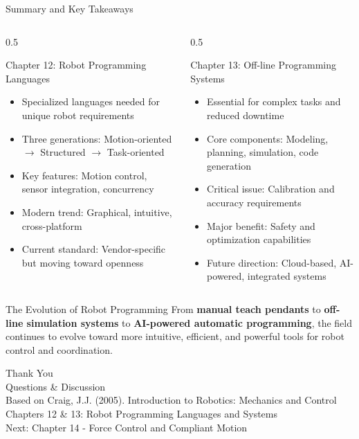 \documentclass[10pt,aspectratio=169]{beamer}
\begin{document}
\begin{frame}{Summary and Key Takeaways}
\begin{columns}[T]
\begin{column}{0.5\textwidth}
\begin{block}{Chapter 12: Robot Programming Languages}
\begin{itemize}
\item Specialized languages needed for unique robot requirements
\item Three generations: Motion-oriented $\rightarrow$ Structured $\rightarrow$ Task-oriented
\item Key features: Motion control, sensor integration, concurrency
\item Modern trend: Graphical, intuitive, cross-platform
\item Current standard: Vendor-specific but moving toward openness
\end{itemize}
\end{block}
\end{column}
\begin{column}{0.5\textwidth}
\begin{block}{Chapter 13: Off-line Programming Systems}
\begin{itemize}
\item Essential for complex tasks and reduced downtime
\item Core components: Modeling, planning, simulation, code generation
\item Critical issue: Calibration and accuracy requirements
\item Major benefit: Safety and optimization capabilities
\item Future direction: Cloud-based, AI-powered, integrated systems
\end{itemize}
\end{block}
\end{column}
\end{columns}

\vspace{1cm}
\begin{alertblock}{The Evolution of Robot Programming}
From \textbf{manual teach pendants} to \textbf{off-line simulation systems} to \textbf{AI-powered automatic programming}, the field continues to evolve toward more intuitive, efficient, and powerful tools for robot control and coordination.
\end{alertblock}
\end{frame}

\begin{frame}
\centering
\vspace{1cm}
{\Huge \textcolor{primary}{Thank You}}\\
\vspace{1cm}
{\Large Questions \& Discussion}\\
\vspace{2cm}
{\small Based on Craig, J.J. (2005). Introduction to Robotics: Mechanics and Control}\\
{\small Chapters 12 \& 13: Robot Programming Languages and Systems}\\
\vspace{0.5cm}
{\tiny Next: Chapter 14 - Force Control and Compliant Motion}
\end{frame}
\end{document}
